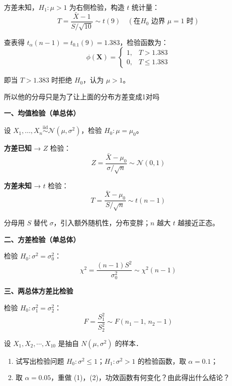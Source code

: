 \begin{solution}
方差未知，$H_1: \mu > 1$ 为右侧检验，构造 $t$ 统计量：
$$T = \frac{\bar{X} - 1}{S/\sqrt{10}} \sim t(9) \quad (\text{在} H_0 \text{ 边界 } \mu = 1 \text{ 时})$$

查表得 $t_{\alpha}(n-1) = t_{0.1}(9) = 1.383$，检验函数为：
$$\phi(\boldsymbol{X}) = \begin{cases} 1, & T > 1.383 \\ 0, & T \leq 1.383 \end{cases}$$

即当 $T > 1.383$ 时拒绝 $H_0$，认为 $\mu > 1$。
\end{solution}
\begin{dxtips}
   所以他的分母只是为了让上面的分布方差变成1对吗
\end{dxtips}
\begin{theorem}[假设检验统计量选择]

\textbf{一、均值检验（单总体）}

设 $X_1, \ldots, X_n \overset{\text{iid}}{\sim} \mathcal{N}(\mu, \sigma^2)$，检验 $H_0: \mu = \mu_0$。

\textbf{方差已知} → $Z$ 检验：
$$Z = \frac{\bar{X} - \mu_0}{\sigma/\sqrt{n}} \sim \mathcal{N}(0,1)$$

\textbf{方差未知} → $t$ 检验：
$$T = \frac{\bar{X} - \mu_0}{S/\sqrt{n}} \sim t(n-1)$$

分母用 $S$ 替代 $\sigma$，引入额外随机性，分布变胖；$n$ 越大 $t$ 越接近正态。

\textbf{二、方差检验（单总体）}

检验 $H_0: \sigma^2 = \sigma_0^2$：
$$\chi^2 = \frac{(n-1)S^2}{\sigma_0^2} \sim \chi^2(n-1)$$

\textbf{三、两总体方差比检验}

检验 $H_0: \sigma_1^2 = \sigma_2^2$：
$$F = \frac{S_1^2}{S_2^2} \sim F(n_1-1,\, n_2-1)$$

\end{theorem}
\begin{homework}[2]
设 $X_1, X_2, \cdots, X_{10}$ 是抽自 $N(\mu, \sigma^2)$ 的样本．

\begin{enumerate}
   

    \item[(2)] 试写出检验问题 $H_0: \sigma^2 \leqslant 1$；$H_1: \sigma^2 > 1$ 的检验函数，取 $\alpha = 0.1$；

    \item[(3)] 取 $\alpha = 0.05$，重做 (1)，(2)，功效函数有何变化？由此得出什么结论？
\end{enumerate}
\end{homework}

